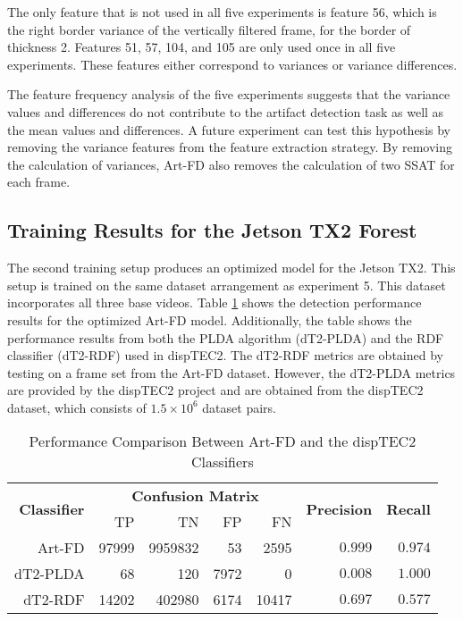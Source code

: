 The only feature that is not used in all five experiments is feature 56, which is the right border variance of the vertically filtered frame, for the border of thickness 2. Features 51, 57, 104, and 105 are only used once in all five experiments. These features either correspond to variances or variance differences.

The feature frequency analysis of the five experiments suggests that the variance values and differences do not contribute to the artifact detection task as well as the mean values and differences. A future experiment can test this hypothesis by removing the variance features from the feature extraction strategy. By removing the calculation of variances, Art-FD also removes the calculation of two SSAT for each frame.

\subsection{Training Results for the Jetson TX2 Forest}
\label{sec:res_train_results_132}

The second training setup produces an optimized model for the Jetson TX2. This setup is trained on the same dataset arrangement as experiment 5. This dataset incorporates all three base videos. Table \ref{tab:metrics_small_model} shows the detection performance results for the optimized Art-FD model. Additionally, the table shows the performance results from both the PLDA algorithm (dT2-PLDA) and the RDF classifier (dT2-RDF) used in dispTEC2. The dT2-RDF metrics are obtained by testing on a frame set from the Art-FD dataset. However, the dT2-PLDA metrics are provided by the dispTEC2 project and are obtained from the dispTEC2 dataset, which consists of $1.5\times10^6$ dataset pairs.

\begin{table}[htbp]
  \caption{Performance Comparison Between Art-FD and the dispTEC2 Classifiers}
  \label{tab:metrics_small_model}
  \centering
  \begin{tabular}{rrrrrrr}
    \hline
    \multirow{2}{*}{\textbf{Classifier}} & \multicolumn{4}{c}{\textbf{Confusion Matrix}} & \multirow{2}{*}{\textbf{Precision}} & \multirow{2}{*}{\textbf{Recall}} \\
    & TP & TN & FP & FN & & \\\hline
    Art-FD & 97999 & 9959832 & 53 & 2595 & $0.999$ & $0.974$ \\
    dT2-PLDA & 68 & 120 & 7972 & 0 & $0.008$ & $1.000$ \\
    dT2-RDF & 14202 & 402980 & 6174 & 10417 & $0.697$ & $0.577$ \\
    \hline
  \end{tabular}
\end{table}

